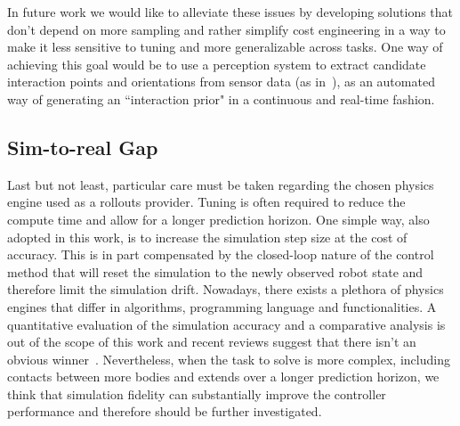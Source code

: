 In future work we would like to alleviate these issues by developing solutions that don't depend on more sampling and rather simplify cost engineering in a way to make it less sensitive to tuning and more generalizable across tasks. One way of achieving this goal would be to use a perception system to extract candidate interaction points and orientations from sensor data (as in~\cite{nagarajan2019grounded}), as an automated way of generating an ``interaction prior" in a continuous and real-time fashion. 

\subsection{Sim-to-real Gap}
Last but not least, particular care must be taken regarding the chosen physics engine used as a rollouts provider. Tuning is often required to reduce the compute time and allow for a longer prediction horizon. One simple way, also adopted in this work, is to increase the simulation step size at the cost of accuracy. This is in part compensated by the closed-loop nature of the control method that will reset the simulation to the newly observed robot state and therefore limit the simulation drift. Nowadays, there exists a plethora of physics engines that differ in algorithms, programming language and functionalities. A quantitative evaluation of the simulation accuracy and a comparative analysis is out of the scope of this work and recent reviews suggest that there isn't an obvious winner~\cite{collins2021review}. Nevertheless, when the task to solve is more complex, including contacts between more bodies and extends over a longer prediction horizon, we think that simulation fidelity can substantially improve the controller performance and therefore should be further investigated. 
